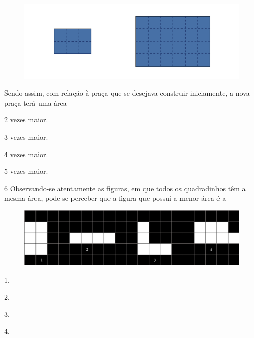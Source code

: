 \begin{figure}[htpb!]
\centering
\includegraphics[width=\textwidth]{media/image30.png}
\end{figure}

Sendo assim, com relação à praça que se desejava construir iniciamente,
a nova praça terá uma área

\begin{multicols}{2}
\begin{escolha}
\item
  2 vezes maior.
\item
  3 vezes maior.
\item
  4 vezes maior.
\item
  5 vezes maior.
\end{escolha}
\end{multicols}


\num{6} Observando-se atentamente as figuras, em que todos os quadradinhos têm a mesma área, pode-se perceber que a figura que possui a menor área é a

\begin{figure}[htpb!]
\centering
\includegraphics[width=\textwidth]{media/image31.png}
\end{figure}

\begin{multicols}{2}
\begin{escolha}
\item
  1.
\item
  2.
\item
  3.
\item
  4.
\end{escolha}
\end{multicols}
\pagebreak

